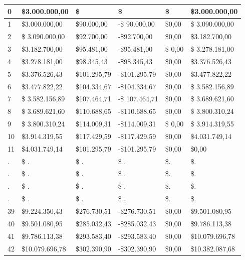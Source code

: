 \begin{spacing}{1.1}
\begin{center}
\begin{tabular}{|p{1cm}|p{}|p{}|p{}|p{}|p{}|}
            0 & \$3.000.000,00 &\$&\$&\$&\$3.000.000,00  \\ \hline
            1 & \$3.000.000,00  &\$90.000,00 & -\$ 90.000,00 &\$0,00&\$ 3.090.000,00  \\ \hline
            2 & \$ 3.090.000,00 &\$92.700,00&-\$92.700,00&\$0,00&\$3.182.700,00 \\ \hline
            3 & \$3.182.700,00 & \$95.481,00&-\$95.481,00&\$ 0,00&\$ 3.278.181,00\\ \hline
            4 & \$3.278.181,00 &\$98.345,43&-\$98.345,43&\$0,00&\$3.376.526,43 \\ \hline
            5 & \$3.376.526,43 &\$101.295,79&-\$101.295,79&\$0,00&\$3.477.822,22 \\ \hline
            6 & \$3.477.822,22 &\$104.334,67&-\$104.334,67&\$0,00&\$ 3.582.156,89  \\ \hline
            7 & \$ 3.582.156,89  &\$107.464,71 & -\$ 107.464,71 &\$0,00&\$ 3.689.621,60  \\ \hline
            8 & \$ 3.689.621,60 &\$110.688,65&-\$110.688,65&\$0,00&\$ 3.800.310,24 \\ \hline
            9 & \$ 3.800.310,24 & \$114.009,31&-\$114.009,31&\$ 0,00&\$ 3.914.319,55\\ \hline
            10 & \$3.914.319,55 &\$117.429,59&-\$117.429,59&\$0,00&\$4.031.749,14 \\ \hline
            11& \$4.031.749,14 &\$101.295,79&-\$101.295,79&\$0,00&\$0,00 \\ \hline
            . & \$ . &\$ .&\$ .&\$. &\$. \\ \hline
            . & \$ . &\$ .&\$ .&\$. &\$. \\ \hline
            . & \$ . &\$ .&\$ .&\$. &\$. \\ \hline
            . & \$ . &\$ .&\$ .&\$. &\$. \\ \hline
            39 & \$9.224.350,43 &\$276.730,51&-\$276.730,51&\$0,00&\$9.501.080,95  \\ \hline
            40 & \$9.501.080,95 &\$285.032,43&-\$285.032,43&\$0,00&\$9.786.113,38 \\ \hline
            41 & \$9.786.113,38 &\$293.583,40&-\$293.583,40&\$0,00&\$10.079.696,78  \\ \hline
            42 & \$10.079.696,78 &\$302.390,90&-\$302.390,90&\$0,00&\$10.382.087,68 \\ \hline
             
\end{tabular}
\end{center}
\end{spacing}
\vspace{2mm}


